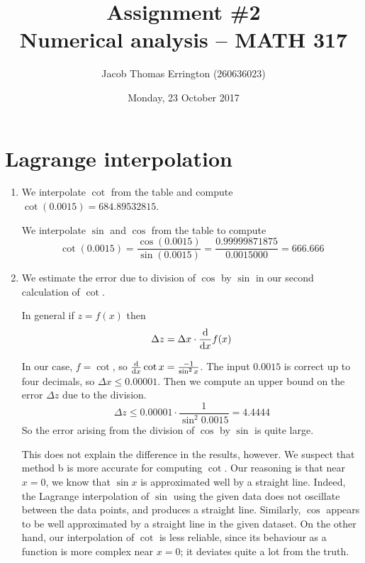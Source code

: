\documentclass[11pt,letterpaper]{article}
\author{Jacob Thomas Errington (260636023)}
\title{Assignment \#2\\Numerical analysis -- MATH 317}
\date{Monday, 23 October 2017}
\begin{document}
\maketitle

\section{Lagrange interpolation}

\begin{enumerate}
  \item
    We interpolate $\cot$ from the table and compute
    $\cot(0.0015) = 684.89532815$.

    We interpolate $\sin$ and $\cos$ from the table to compute
    \begin{equation*}
      \cot(0.0015)
      = \frac{\cos(0.0015)}{\sin(0.0015)}
      = \frac{0.99999871875}{0.0015000}
      = 666.666
    \end{equation*}

  \item
    We estimate the error due to division of $\cos$ by $\sin$ in our second
    calculation of $\cot$.

    In general if $z = f(x)$ then
    \begin{equation*}
      \Delta z = \Delta x \cdot \frac{\mathrm{d} }{\mathrm{d} x} f(x)
    \end{equation*}

    In our case, $f = \cot$, so $\frac{\mathrm{d} }{\mathrm{d} x} \cot x = \frac{-1}{\sin^2 x}$.
    The input $0.0015$ is correct up to four decimals, so
    $\Delta x \leq 0.00001$.
    Then we compute an upper bound on the error $\Delta z$ due to the division.
    \begin{equation*}
      \Delta z
      \leq 0.00001 \cdot \frac{1}{\sin^2 0.0015}
      = 4.4444
    \end{equation*}
    So the error arising from the division of $\cos$ by $\sin$ is quite large.

    This does not explain the difference in the results, however.
    We suspect that method b is more accurate for computing $\cot$.
    Our reasoning is that near $x = 0$, we know that $\sin x$ is approximated
    well by a straight line.
    Indeed, the Lagrange interpolation of $\sin$ using the given data does not
    oscillate between the data points, and produces a straight line.
    Similarly, $\cos$ appears to be well approximated by a straight line in the
    given dataset.
    On the other hand, our interpolation of $\cot$ is less reliable, since its
    behaviour as a function is more complex near $x = 0$; it deviates quite a
    lot from the truth.
\end{enumerate}
\end{document}
